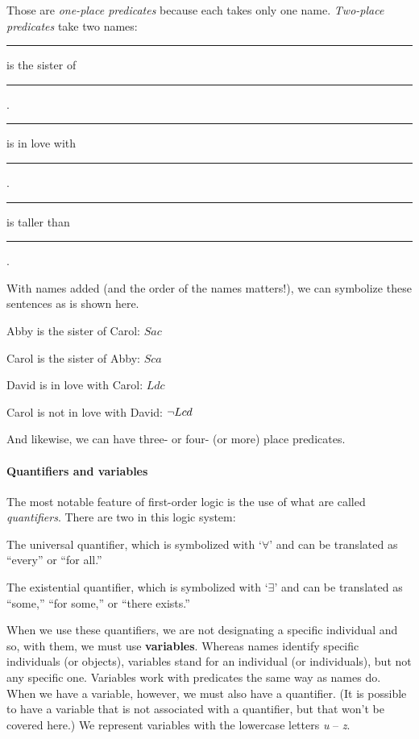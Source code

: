 Those are \textit{one-place predicates} because each takes only one name. \textit{Two-place predicates} take two names:
\begin{ekey}
	\item[S] \rule{1cm}{0.15mm} is the sister of \rule{1cm}{0.15mm} .
	\item[L] \rule{1cm}{0.15mm} is in love with \rule{1cm}{0.15mm} .
	\item[T] \rule{1cm}{0.15mm} is taller than \rule{1cm}{0.15mm} .
\end{ekey}
With names added (and the order of the names matters!), we can symbolize these sentences as is shown here.

\begin{ebullet}
	\item[] Abby is the sister of Carol: $Sac$
	\item[] Carol is the sister of Abby: $Sca$
	\item[] David is in love with Carol: $Ldc$
	\item[] Carol is not in love with David: ${\neg} Lcd$
\end{ebullet}
And likewise, we can have three- or four- (or more) place predicates. 


\paragraph{Quantifiers and variables}

The most notable feature of first-order logic is the use of what are called \textit{quantifiers}. There are two in this logic system:

\begin{ebullet}
	\item[(\textit{a})] The universal quantifier, which is symbolized with `$\forall$' and can be translated as ``every'' or ``for all.''
	\item[(\textit{b})] The existential quantifier, which is symbolized with `$\exists$' and can be translated as ``some,'' ``for some,'' or ``there exists.''
\end{ebullet}

When we use these quantifiers, we are not designating a specific individual and so, with them, we must use \textbf{variables}. Whereas names identify specific individuals (or objects), variables stand for an individual (or individuals), but not any specific one. Variables work with predicates the same way as names do. When we have a variable, however, we must also have a quantifier. (It is possible to have a variable that is not associated with a quantifier, but that won't be covered here.) We represent variables with the lowercase letters \textit{u} -- \textit{z}.

